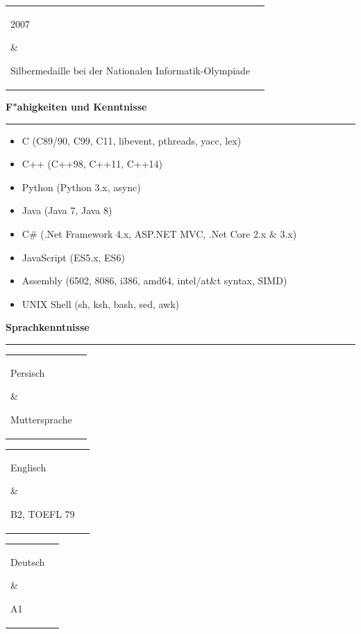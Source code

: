 \documentclass[11pt,a4paper,oneside]{article}
\makeatletter
\renewcommand{\section}[1]{%
{\large\textbf{#1}}\\
\rule[9pt]{18cm}{.4pt}\vspace{-16pt}%
}
\newenvironment{mytable}{%
\begin{tabular}{@{}l@{\hspace{4mm}}l@{}}%
}{\end{tabular}}
\newcommand{\myitem}[2]{%
\parbox[t]{16mm}{#1}&\parbox[t]{16cm}{#2}\\%
}
\makeatother
\begin{document}
\begin{mytable}\myitem{2007}{
Silbermedaille bei der Nationalen Informatik-Olympiade
}\end{mytable}

\section{F"ahigkeiten und Kenntnisse}
\begin{itemize}
\item C (C89/90, C99, C11, libevent, pthreads, yacc, lex)
\item C++ (C++98, C++11, C++14)
\item Python (Python 3.x, async)
\item Java (Java 7, Java 8)
\item C\# (.Net Framework 4.x, ASP.NET MVC, .Net Core 2.x \& 3.x)
\item JavaScript (ES5.x, ES6)
\item Assembly (6502, 8086, i386, amd64, intel/at\&t syntax, SIMD)
\item UNIX Shell (sh, ksh, bash, sed, awk)
\end{itemize}

\section{Sprachkenntnisse}

\begin{mytable}\myitem{Persisch}{
	Muttersprache
}\end{mytable}

\begin{mytable}\myitem{Englisch}{
	B2, TOEFL 79
}\end{mytable}

\begin{mytable}\myitem{Deutsch}{
	A1
}\end{mytable}
\end{document}
